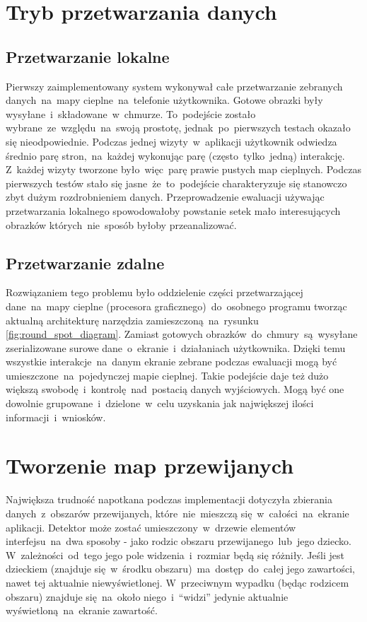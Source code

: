 \section{Tryb przetwarzania danych}

\subsection{Przetwarzanie lokalne}
Pierwszy zaimplementowany system wykonywał całe przetwarzanie zebranych danych~na~mapy cieplne~na~telefonie użytkownika. Gotowe obrazki były wysyłane~i~składowane~w~chmurze. To~podejście zostało wybrane~ze~względu~na~swoją prostotę, jednak~po~pierwszych testach okazało się nieodpowiednie. Podczas jednej wizyty~w~aplikacji  użytkownik odwiedza średnio parę stron,~na~każdej wykonując parę (często~tylko~jedną) interakcję. Z~każdej wizyty tworzone było~więc~parę prawie pustych map cieplnych. Podczas pierwszych testów stało się jasne~że~to~podejście charakteryzuje się stanowczo zbyt dużym rozdrobnieniem danych. Przeprowadzenie ewaluacji używając przetwarzania lokalnego spowodowałoby powstanie setek mało interesujących obrazków których~nie~sposób byłoby przeanalizować.

\subsection{Przetwarzanie zdalne}
Rozwiązaniem tego problemu było oddzielenie części przetwarzającej dane~na~mapy cieplne (procesora graficznego)~do~osobnego programu tworząc aktualną architekturę narzędzia zamieszczoną~na~rysunku \ref{fig:round_spot_diagram}. Zamiast gotowych obrazków~do~chmury~są~wysyłane zserializowane surowe dane~o~ekranie~i~działaniach użytkownika. Dzięki temu wszystkie interakcje~na~danym ekranie zebrane podczas ewaluacji mogą być umieszczone~na~pojedynczej mapie cieplnej. Takie podejście daje też dużo większą swobodę~i~kontrolę~nad~postacią danych wyjściowych. Mogą być one dowolnie grupowane~i~dzielone~w~celu uzyskania jak największej ilości informacji~i~wniosków.

\section{Tworzenie map przewijanych}
Największa trudność napotkana podczas implementacji dotyczyła zbierania danych~z~obszarów przewijanych, które~nie~mieszczą się~w~całości~na~ekranie aplikacji. Detektor może zostać umieszczony~w~drzewie elementów interfejsu~na~dwa sposoby - jako rodzic obszaru przewijanego~lub~jego dziecko. W~zależności~od~tego jego pole widzenia~i~rozmiar będą się różniły. Jeśli jest dzieckiem (znajduje się~w~środku obszaru)~ma~dostęp~do~całej jego zawartości, nawet tej aktualnie niewyświetlonej. W~przeciwnym wypadku (będąc rodzicem obszaru) znajduje się~na~około niego~i~``widzi'' jedynie aktualnie wyświetloną~na~ekranie zawartość.

